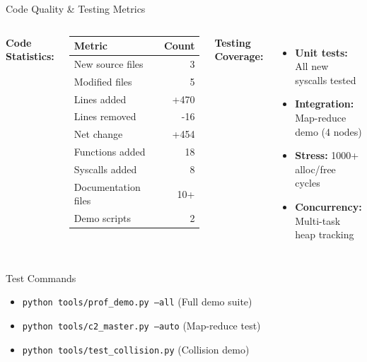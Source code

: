 \documentclass[aspectratio=169, 10pt]{beamer}
\begin{document}
\begin{frame}{Code Quality \& Testing Metrics}
    \begin{columns}[T]
        \textbf{Code Statistics:}
        \vspace{0.1cm}
        \begin{table}
            \tiny
            \begin{tabular}{@{}lr@{}}
                \toprule
                \textbf{Metric} & \textbf{Count} \\
                \midrule
                New source files & 3 \\
                Modified files & 5 \\
                Lines added & +470 \\
                Lines removed & -16 \\
                Net change & +454 \\
                Functions added & 18 \\
                Syscalls added & 8 \\
                \midrule
                Documentation files & 10+ \\
                Demo scripts & 2 \\
                \bottomrule
            \end{tabular}
        \end{table}

        \textbf{Testing Coverage:}
        \vspace{0.1cm}
        \begin{itemize}\setlength{\itemsep}{3pt}
            \item[$\checkmark$] \textbf{Unit tests:} All new syscalls tested
            \item[$\checkmark$] \textbf{Integration:} Map-reduce demo (4 nodes)
            \item[$\checkmark$] \textbf{Stress:} 1000+ alloc/free cycles
            \item[$\checkmark$] \textbf{Concurrency:} Multi-task heap tracking
        \end{itemize}
    \end{columns}

    \vspace{0.3cm}
    \begin{exampleblock}{Test Commands}
        \begin{itemize}\setlength{\itemsep}{2pt}
            \item \texttt{python tools/prof\_demo.py --all} (Full demo suite)
            \item \texttt{python tools/c2\_master.py --auto} (Map-reduce test)
            \item \texttt{python tools/test\_collision.py} (Collision demo)
        \end{itemize}
    \end{exampleblock}
\end{frame}
\end{document}
